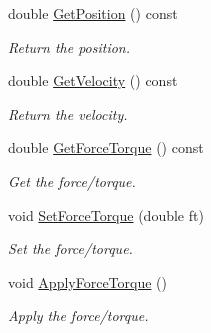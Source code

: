 \begin{DoxyCompactItemize}
double \hyperlink{classosa_o_d_e_joint_a88e1b234bb1dad9ca38a600966cfddbc}{Get\-Position} () const 
\begin{DoxyCompactList}\small\item\em Return the position. \end{DoxyCompactList}\item 
double \hyperlink{classosa_o_d_e_joint_a169a67703c56518e37e3a56ca0fb9d6b}{Get\-Velocity} () const 
\begin{DoxyCompactList}\small\item\em Return the velocity. \end{DoxyCompactList}\item 
double \hyperlink{classosa_o_d_e_joint_ab96ddbc259453a582ff58b0379bab6d0}{Get\-Force\-Torque} () const 
\begin{DoxyCompactList}\small\item\em Get the force/torque. \end{DoxyCompactList}\item 
void \hyperlink{classosa_o_d_e_joint_aaba2dff816bda2a05361d47b0ed67aa4}{Set\-Force\-Torque} (double ft)
\begin{DoxyCompactList}\small\item\em Set the force/torque. \end{DoxyCompactList}\item 
void \hyperlink{classosa_o_d_e_joint_ac11f4cf57ea8219c7de6026685069ff1}{Apply\-Force\-Torque} ()
\begin{DoxyCompactList}\small\item\em Apply the force/torque. \end{DoxyCompactList}\end{DoxyCompactItemize}


